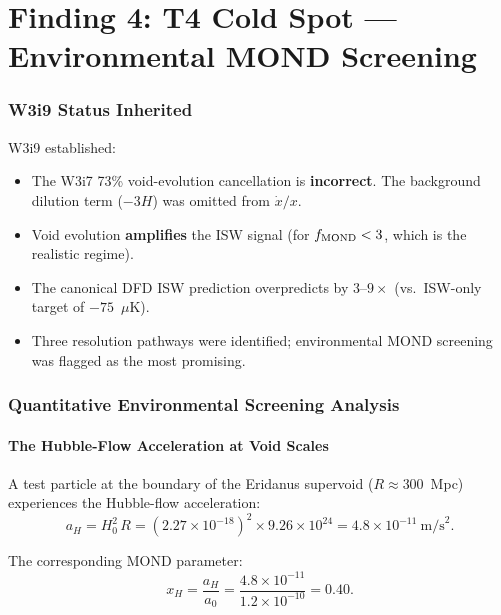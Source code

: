 \documentclass[11pt,a4paper]{article}
\newcommand{\ee}[1]{\times 10^{#1}}
\newcommand{\Hzero}{H_0}
\newcommand{\aM}{a_0}
\begin{document}
\part{Finding 4: T4 Cold Spot --- Environmental MOND Screening}
\label{part:T4}

\section{W3i9 Status Inherited}
\label{sec:T4-status}

W3i9 established:
\begin{itemize}[nosep]
\item The W3i7 73\% void-evolution cancellation is \textbf{incorrect}.
  The background dilution term ($-3H$) was omitted from $\dot{x}/x$.
\item Void evolution \textbf{amplifies} the ISW signal (for $f_{\rm MOND}
  < 3$, which is the realistic regime).
\item The canonical DFD ISW prediction overpredicts by $3$--$9\times$
  (vs.\ ISW-only target of $-75$~$\mu$K).
\item Three resolution pathways were identified; environmental MOND
  screening was flagged as the most promising.
\end{itemize}

\section{Quantitative Environmental Screening Analysis}
\label{sec:screening}

\subsection{The Hubble-Flow Acceleration at Void Scales}

A test particle at the boundary of the Eridanus supervoid
($R \approx 300$~Mpc) experiences the Hubble-flow acceleration:
\begin{equation}
a_H = \Hzero^2\,R = (2.27\ee{-18})^2 \times 9.26\ee{24}
= 4.8\ee{-11}~\text{m/s}^2.
\end{equation}

The corresponding MOND parameter:
\begin{equation}
x_H = \frac{a_H}{\aM} = \frac{4.8\ee{-11}}{1.2\ee{-10}} = 0.40.
\end{equation}
\end{document}
